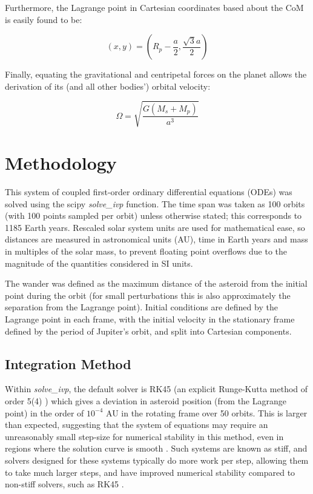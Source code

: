 \documentclass[11pt, a4paper,twocolumn]{article} %
\begin{document}
Furthermore, the Lagrange point in Cartesian coordinates based about the CoM is easily found to be:

\begin{equation}
(x,y) = \left( R_{p} - \frac{a}{2}, \frac{ \sqrt{3} a}{2} \right)
\end{equation}

Finally, equating the gravitational and centripetal forces on the planet allows the derivation of its (and all other bodies') orbital velocity:

\begin{equation} \label{frequency}
\Omega = \sqrt{\frac{G (M_{s} + M_{p})}{a^{3}}}
\end{equation}

\section{Methodology}
This system of coupled first-order ordinary differential equations (ODEs) was solved using the scipy \textit{solve\_ivp} function. The time span was taken as 100 orbits (with 100 points sampled per orbit) unless otherwise stated; this corresponds to 1185 Earth years. Rescaled solar system units are used for mathematical ease, so distances are measured in astronomical units (AU), time in Earth years and mass in multiples of the solar mass, to prevent floating point overflows due to the magnitude of the quantities considered in SI units.

The wander was defined as the maximum distance of the asteroid from the initial point during the orbit (for small perturbations this is also approximately the separation from the Lagrange point). Initial conditions are defined by the Lagrange point in each frame, with the initial velocity in the stationary frame defined by the period of Jupiter's orbit, and split into Cartesian components.

\subsection{Integration Method}
Within \textit{solve\_ivp}, the default solver is RK45 (an explicit Runge-Kutta method of order 5(4) \cite{Dormand1980}) which gives a deviation in asteroid position (from the Lagrange point) in the order of $ 10^{-4}$ AU in the rotating frame over 50 orbits. This is larger than expected, suggesting that the system of equations may require an unreasonably small step-size for numerical stability in this method, even in regions where the solution curve is smooth \cite{Lambert1991}. Such systems are known as stiff, and solvers designed for these systems typically do more work per step, allowing them to take much larger steps, and have improved numerical stability compared to non-stiff solvers, such as RK45 \cite{Byrne1987}. 
\end{document}
